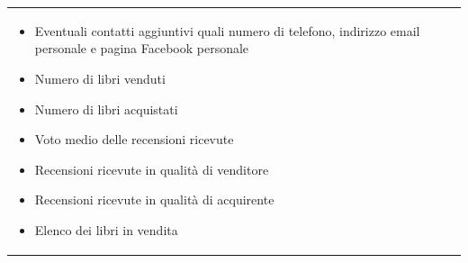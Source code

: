 \documentclass[10pt,a4paper]{report}
\begin{document}
\begin{tabular}{lp{}}
\begin{enumerate}
\begin{itemize}
				\item Eventuali contatti aggiuntivi quali numero di telefono, indirizzo email personale e pagina Facebook personale
				\item Numero di libri venduti
				\item Numero di libri acquistati
				\item Voto medio delle recensioni ricevute
				\item Recensioni ricevute in qualità di venditore
				\item Recensioni ricevute in qualità di acquirente
				\item Elenco dei libri in vendita
			\end{itemize}
		\end{enumerate}
	\end{tabular}
	
\end{document}
